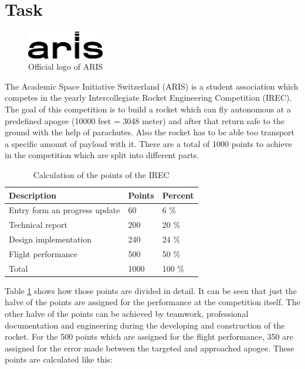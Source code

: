 
 \section{Task}
 
 \begin{figure}[h!]
 \centering
 \includegraphics[width=0.3\textwidth]{./Pictures/ARIS_logo.png}
 \caption{Official logo of ARIS \cite{ARIS}}
 \label{fig:ArisLogo}
\end{figure}

 The Academic Space Initiative Switzerland (ARIS) is a student association which competes in the yearly Intercollegiate Rocket Engineering Competition (IREC).
 The goal of this competition is to build a rocket which can fly autonomous at a predefined apogee (10000 feet = 3048 meter) and after that return safe to the ground with the help of parachutes.
 Also the rocket has to be able too transport a specific amount of payload with it.
 There are a total of 1000 points to achieve in the competition which are split into different parts.
 
\begin{table}[h]
\centering
\begin{tabular}{|l|l|l|}\hline
{\bf Description} & {\bf Points} & {\bf Percent}\\\hline
Entry form an progress update & 60 & 6 \% \\ \hline
Technical report & 200 & 20 \% \\ \hline
Design implementation & 240 & 24 \% \\ \hline
Flight performance & 500 & 50 \% \\ \hline
Total & 1000 & 100 \% \\ \hline 
\end{tabular}
\caption{Calculation of the points of the IREC}
\label{tab:CompetitionCalculation}
\end{table}  

 Table \ref{tab:CompetitionCalculation} shows how those points are divided in detail. 
 It can be seen that just the halve of the points are assigned for the performance at the competition itself.
 The other halve of the points can be achieved by teamwork, professional documentation and engineering during the developing and construction of the rocket.
 For the 500 points which are assigned for the flight performance, 350 are assigned for the error made between the targeted and approached apogee.
 These points are calculated like this:
 
